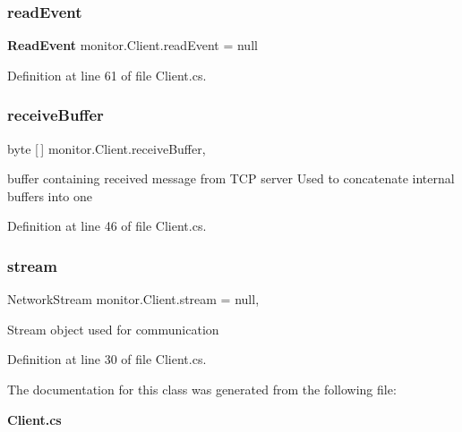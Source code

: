 \subsubsection{read\+Event}
{\footnotesize\ttfamily \textbf{ Read\+Event} monitor.\+Client.\+read\+Event = null\hspace{0.3cm}{\ttfamily [static]}}



Definition at line 61 of file Client.\+cs.

\mbox{\label{classmonitor_1_1_client_aade32a6043e0dc629509f0e1c0112a24}} 
\subsubsection{receive\+Buffer}
{\footnotesize\ttfamily byte [$\,$] monitor.\+Client.\+receive\+Buffer\hspace{0.3cm}{\ttfamily [static]}, {\ttfamily [private]}}



buffer containing received message from T\+CP server Used to concatenate internal buffers into one 



Definition at line 46 of file Client.\+cs.

\mbox{\label{classmonitor_1_1_client_a8de2a9e4fe2c2e896849ddd33d80d759}} 
\subsubsection{stream}
{\footnotesize\ttfamily Network\+Stream monitor.\+Client.\+stream = null\hspace{0.3cm}{\ttfamily [static]}, {\ttfamily [private]}}



Stream object used for communication 



Definition at line 30 of file Client.\+cs.



The documentation for this class was generated from the following file\+:\begin{DoxyCompactItemize}
\item 
\textbf{ Client.\+cs}\end{DoxyCompactItemize}
